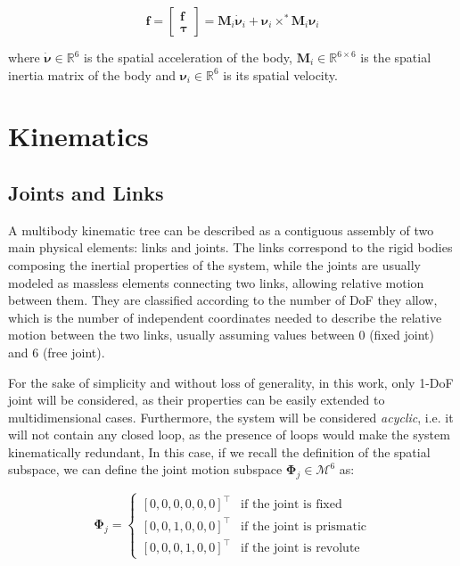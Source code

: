\begin{equation}
    \mathbf{f} = \begin{bmatrix}
        \mathbf{f} \\
        \boldsymbol{\tau}
    \end{bmatrix} = \mathbf{M}_i \dot{\boldsymbol{\nu}} _i + \boldsymbol{\nu}_i \times ^* \mathbf{M}_i \boldsymbol{\nu}_i
\end{equation}

where $\dot{\boldsymbol{\nu}} \in \mathbb{R}^6$ is the spatial acceleration of the body, $\mathbf{M}_i \in \mathbb{R}^{6 \times 6}$ is the spatial inertia matrix of the body and $\boldsymbol{\nu}_i \in \mathbb{R}^6$ is its spatial velocity.

\section{Kinematics}

\subsection{Joints and Links}

A multibody kinematic tree can be described as a contiguous assembly of two main physical elements: links and joints. The links correspond to the rigid bodies composing the inertial properties of the system, while the joints are usually modeled as massless elements connecting two links, allowing relative motion between them. They are classified according to the number of \ac{DoF} they allow, which is the number of independent coordinates needed to describe the relative motion between the two links, usually assuming values between 0 (fixed joint) and 6 (free joint).

For the sake of simplicity and without loss of generality, in this work, only 1-\ac{DoF} joint will be considered, as their properties can be easily extended to multidimensional cases. Furthermore, the system will be considered \textit{acyclic}, i.e. it will not contain any closed loop, as the presence of loops would make the system kinematically redundant,
In this case, if we recall the definition of the spatial subspace, we can define the joint motion subspace $\boldsymbol{\Phi} _j \in \mathcal{M} ^6$ as:

\begin{equation}
    \boldsymbol{\Phi} _j =
    \begin{cases}
        [0, 0, 0, 0, 0, 0] ^\top & \text{if the joint is fixed}     \\
        [0, 0, 1, 0, 0, 0] ^\top & \text{if the joint is prismatic} \\
        [0, 0, 0, 1, 0, 0] ^\top & \text{if the joint is revolute}
    \end{cases}
\end{equation}

